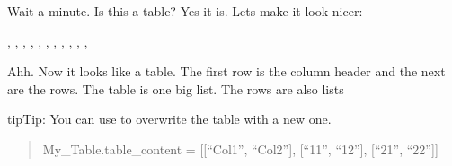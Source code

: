 \documentclass[letterpaper,10pt,english]{sphinxmanual}
\begin{document}
Wait a minute. Is this a table? Yes it is. Lets make it look nicer:

\begin{sphinxVerbatim}[commandchars=\\\{\}]
\PYG{o}{[}
    \PYG{o}{[}, , \PYG{o}{]},
    \PYG{o}{[}, , \PYG{o}{]},
    \PYG{o}{[}, , \PYG{o}{]},
    \PYG{o}{[}, , \PYG{o}{]}
\PYG{o}{]}
\end{sphinxVerbatim}

Ahh. Now it looks like a table. The first row is the column header and the
next are the rows. The table is one big list. The rows are also lists

\begin{sphinxadmonition}{tip}{Tip:}
You can use  to overwrite the table with a new one.
\begin{quote}

My\_Table.table\_content = {[}{[}“Col1”, “Col2”{]}, {[}“11”, “12”{]}, {[}“21”, “22”{]}{]}
\end{quote}
\end{sphinxadmonition}



\renewcommand{\indexname}{Index}
\printindex
\end{document}
